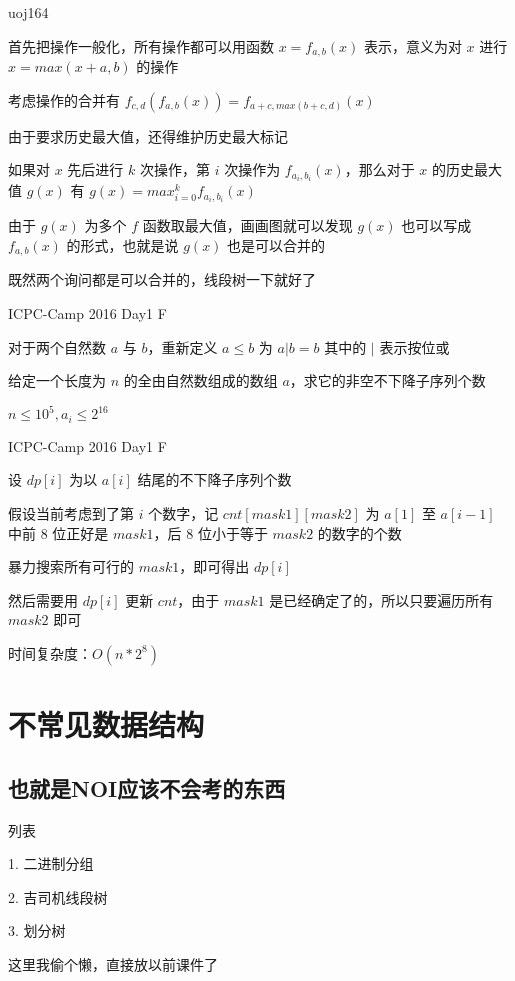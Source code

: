 \documentclass[UTF8]{beamer}
\begin{document}
			\begin{frame}{uoj164}

			首先把操作一般化，所有操作都可以用函数 $x=f_{a,b}(x)$ 表示，意义为对 $x$ 进行 $x=max(x+a,b)$ 的操作

			考虑操作的合并有 $f_{c,d}(f_{a,b}(x))=f_{a+c,max(b+c,d)}(x)$

			由于要求历史最大值，还得维护历史最大标记

			如果对 $x$ 先后进行 $k$ 次操作，第 $i$ 次操作为 $f_{a_i,b_i}(x)$，那么对于 $x$ 的历史最大值 $g(x)$ 有 $g(x)=max_{i=0}^k f_{a_i,b_i}(x)$

			由于 $g(x)$ 为多个 $f$ 函数取最大值，画画图就可以发现 $g(x)$ 也可以写成 $f_{a,b}(x)$ 的形式，也就是说 $g(x)$ 也是可以合并的

			既然两个询问都是可以合并的，线段树一下就好了

			\end{frame}

			\begin{frame}{ICPC-Camp 2016 Day1 F}

			对于两个自然数 $a$ 与 $b$，重新定义 $a \le b$ 为 $ a|b = b$ 其中的 $|$ 表示按位或

			给定一个长度为 $n$ 的全由自然数组成的数组 $a$，求它的非空不下降子序列个数

			$n \le 10^5, a_i \le 2^{16}$

			\end{frame}

			\begin{frame}{ICPC-Camp 2016 Day1 F}

			设 $dp[i]$ 为以 $a[i]$ 结尾的不下降子序列个数

			假设当前考虑到了第 $i$ 个数字，记 $cnt[mask1][mask2]$ 为 $a[1]$ 至 $a[i-1]$ 中前 $8$ 位正好是 $mask1$，后 $8$ 位小于等于 $mask2$ 的数字的个数

			暴力搜索所有可行的 $mask1$，即可得出 $dp[i]$

			然后需要用 $dp[i]$ 更新 $cnt$，由于 $mask1$ 是已经确定了的，所以只要遍历所有 $mask2$ 即可

			时间复杂度：$O(n*2^8)$

			\end{frame}

	\section{不常见数据结构}

		\subsection{也就是NOI应该不会考的东西}

			\begin{frame}{列表}

			1. 二进制分组

			2. 吉司机线段树

			3. 划分树

			这里我偷个懒，直接放以前课件了

			\end{frame}
\end{document}
